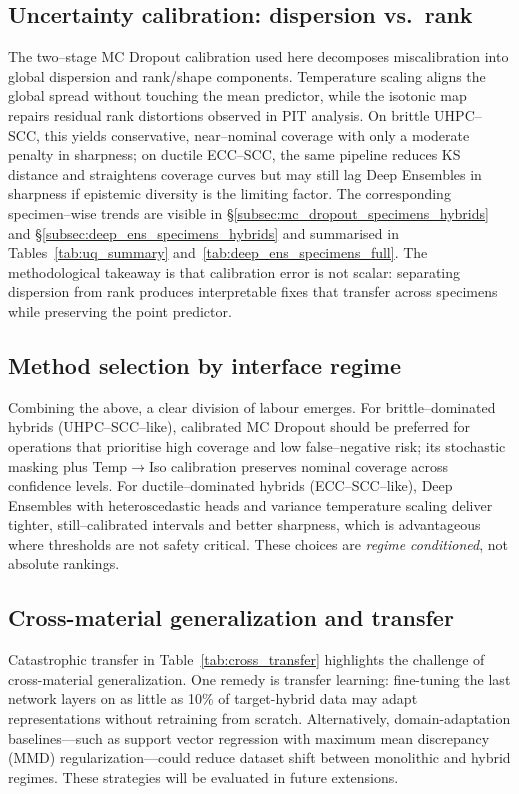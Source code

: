 \documentclass{article}
\begin{document}
\subsection{Uncertainty calibration: dispersion vs.\ rank}
The two–stage MC Dropout calibration used here decomposes miscalibration into global dispersion and rank/shape components. Temperature scaling aligns the global spread without touching the mean predictor, while the isotonic map repairs residual rank distortions observed in PIT analysis. On brittle UHPC–SCC, this yields conservative, near–nominal coverage with only a moderate penalty in sharpness; on ductile ECC–SCC, the same pipeline reduces KS distance and straightens coverage curves but may still lag Deep Ensembles in sharpness if epistemic diversity is the limiting factor. The corresponding specimen–wise trends are visible in \S\ref{subsec:mc_dropout_specimens_hybrids} and \S\ref{subsec:deep_ens_specimens_hybrids} and summarised in Tables~\ref{tab:uq_summary} and~\ref{tab:deep_ens_specimens_full}. The methodological takeaway is that calibration error is not scalar: separating dispersion from rank produces interpretable fixes that transfer across specimens while preserving the point predictor.

\subsection{Method selection by interface regime}
Combining the above, a clear division of labour emerges. For brittle–dominated hybrids (UHPC–SCC–like), calibrated MC Dropout should be preferred for operations that prioritise high coverage and low false–negative risk; its stochastic masking plus Temp$\rightarrow$Iso calibration preserves nominal coverage across confidence levels. For ductile–dominated hybrids (ECC–SCC–like), Deep Ensembles with heteroscedastic heads and variance temperature scaling deliver tighter, still–calibrated intervals and better sharpness, which is advantageous where thresholds are not safety critical. These choices are \emph{regime conditioned}, not absolute rankings.

\subsection{Cross-material generalization and transfer}
Catastrophic transfer in Table~\ref{tab:cross_transfer} highlights the challenge of cross-material generalization. 
One remedy is transfer learning: fine-tuning the last network layers on as little as 10\% of target-hybrid data may adapt representations without retraining from scratch. 
Alternatively, domain-adaptation baselines—such as support vector regression with maximum mean discrepancy (MMD) regularization—could reduce dataset shift between monolithic and hybrid regimes. 
These strategies will be evaluated in future extensions.
\end{document}
